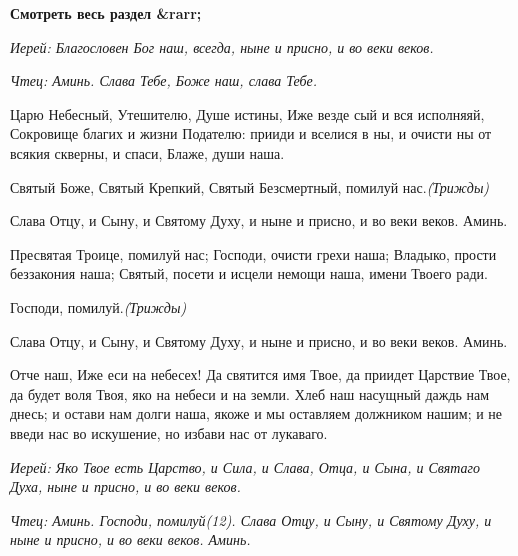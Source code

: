 


\bfseries Смотреть весь раздел &rarr;\normalfont{} 

 



\itshape Иерей:\normalfont{} Благословен Бог наш, всегда, ныне и присно, и во веки веков.


\itshape Чтец:\normalfont{} Аминь. Слава Тебе, Боже наш, слава Тебе.






Царю Небесный, Утешителю, Душе истины, Иже везде сый и вся исполняяй, Сокровище благих и жизни Подателю: прииди и вселися в ны, и очисти ны от всякия скверны, и спаси, Блаже, души наша.






Святый Боже, Святый Крепкий, Святый Безсмертный, помилуй нас.\itshape  (Трижды)


\normalfont{}Слава Отцу, и Сыну, и Святому Духу, и ныне и присно, и во веки веков. Аминь.






Пресвятая Троице, помилуй нас; Господи, очисти грехи наша; Владыко, прости беззакония наша; Святый, посети и исцели немощи наша, имени Твоего ради.






Господи, помилуй.\itshape  (Трижды)\normalfont{}



Слава Отцу, и Сыну, и Святому Духу, и ныне и присно, и во веки веков. Аминь.



Отче наш, Иже еси на небесех! Да святится имя Твое, да приидет Царствие Твое, да будет воля Твоя, яко на небеси и на земли. Хлеб наш насущный даждь нам днесь; и остави нам долги наша, якоже и мы оставляем должником нашим; и не введи нас во искушение, но избави нас от лукаваго.


\itshape Иерей:\normalfont{} Яко Твое есть Царство, и Сила, и Слава, Отца, и Сына, и Святаго Духа, ныне и присно, и во веки веков.


\itshape Чтец:\normalfont{} Аминь. Господи, помилуй\itshape  (12)\normalfont{}. Слава Отцу, и Сыну, и Святому Духу, и ныне и присно, и во веки веков. Аминь.



